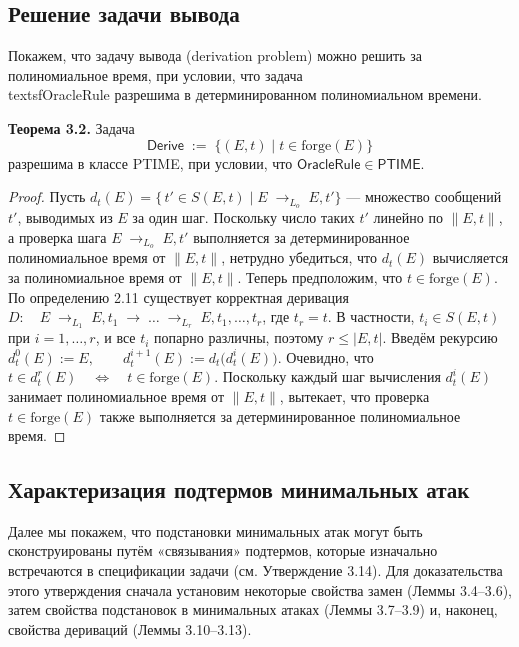 \subsection{Решение задачи вывода}

Покажем, что задачу вывода (derivation problem) можно решить за полиномиальное время, при условии, что задача \\textsf{OracleRule} разрешима в детерминированном полиномиальном времени.

\medskip
\noindent\textbf{Теорема 3.2.} Задача
\[
\mathsf{Derive} \;:=\; \{(E,t)\mid t\in\mathrm{forge}(E)\}
\]
разрешима в классе \textsf{P}\textsf{TIME}, при условии, что \(\mathsf{OracleRule}\in\textsf{P}\textsf{TIME}\).

\begin{proof}
Пусть $d_{t}(E)=\{\,t'\in S(E,t)\mid E\;\to_{L_o}\;E,t'\}$
— множество сообщений $t'$, выводимых из $E$ за один шаг. Поскольку число таких $t'$ линейно по $\|E,t\|$, а проверка шага 
$E\;\to_{L_o}\;E,t'$
выполняется за детерминированное полиномиальное время от $\|E,t\|$, нетрудно убедиться, что $d_{t}(E)$ вычисляется за полиномиальное время от $\|E,t\|$. 
Теперь предположим, что $t\in\mathrm{forge}(E)$. По определению 2.11 существует корректная деривация
$D:\quad E \;\to_{L_{1}}\;E, t_{1} \;\to\;\dots\; \to_{L_{r}}\;E, t_1, \dots, t_r$,
где $t_{r}=t$. В частности, $t_{i}\in S(E,t)$ при $i=1,\dots,r$, и все $t_{i}$ попарно различны, поэтому $r\le|E,t|$. Введём рекурсию
$d_{t}^{0}(E):=E, \qquad d_{t}^{i+1}(E):=d_{t}\bigl(d_{t}^{i}(E)\bigr)$.
Очевидно, что 
$t\in d_{t}^{r}(E) \quad\Longleftrightarrow\quad t\in\mathrm{forge}(E)$.
Поскольку каждый шаг вычисления $d_{t}^{i}(E)$ занимает полиномиальное время от $\|E,t\|$, вытекает, что проверка $t\in\mathrm{forge}(E)$ также выполняется за детерминированное полиномиальное время.  
\end{proof}

\subsection{Характеризация подтермов минимальных атак}

Далее мы покажем, что подстановки минимальных атак могут быть сконструированы путём «связывания» подтермов, которые изначально встречаются в спецификации задачи (см. Утверждение 3.14). Для доказательства этого утверждения сначала установим некоторые свойства замен (Леммы 3.4–3.6), затем свойства подстановок в минимальных атаках (Леммы 3.7–3.9) и, наконец, свойства дериваций (Леммы 3.10–3.13).

